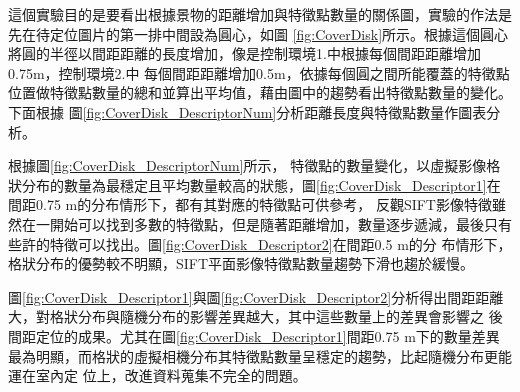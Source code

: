 	這個實驗目的是要看出根據景物的距離增加與特徵點數量的關係圖，實驗的作法是先在待定位圖片的第一排中間設為圓心，如圖
\ref{fig:CoverDisk}所示。根據這個圓心將圓的半徑以間距距離的長度增加，像是控制環境1.中根據每個間距距離增加0.75m，控制環境2.中                                                                               
每個間距距離增加0.5m，依據每個圓之間所能覆蓋的特徵點位置做特徵點數量的總和並算出平均值，藉由圖中的趨勢看出特徵點數量的變化。下面根據
圖\ref{fig:CoverDisk_DescriptorNum}分析距離長度與特徵點數量作圖表分析。

	根據圖\ref{fig:CoverDisk_DescriptorNum}所示，
特徵點的數量變化，以虛擬影像格狀分布的數量為最穩定且平均數量較高的狀態，圖\ref{fig:CoverDisk_Descriptor1}在間距0.75 m的分布情形下，都有其對應的特徵點可供參考，
反觀SIFT影像特徵雖然在一開始可以找到多數的特徵點，但是隨著距離增加，數量逐步遞減，最後只有些許的特徵可以找出。圖\ref{fig:CoverDisk_Descriptor2}在間距0.5 m的分
布情形下，格狀分布的優勢較不明顯，SIFT平面影像特徵點數量趨勢下滑也趨於緩慢。

	圖\ref{fig:CoverDisk_Descriptor1}與圖\ref{fig:CoverDisk_Descriptor2}分析得出間距距離大，對格狀分布與隨機分布的影響差異越大，其中這些數量上的差異會影響之
後間距定位的成果。尤其在圖\ref{fig:CoverDisk_Descriptor1}間距0.75 m下的數量差異最為明顯，而格狀的虛擬相機分布其特徵點數量呈穩定的趨勢，比起隨機分布更能運在室內定
位上，改進資料蒐集不完全的問題。
	
